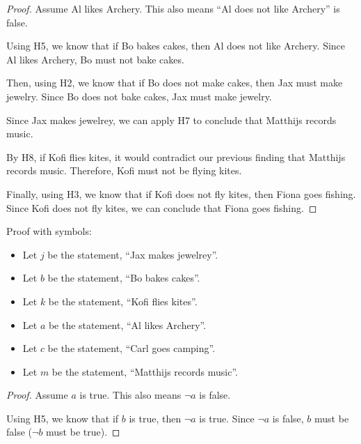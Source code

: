 \documentclass{article}
\begin{document}
\begin{enumerate}
          \begin{proof}
              Assume Al likes Archery. This also means ``Al does not like Archery'' is false.

              Using H5, we know that if Bo bakes cakes, then Al does not like Archery. Since
              Al likes Archery, Bo must not bake cakes.

              Then, using H2, we know that if Bo does not make cakes, then Jax must make
              jewelry. Since Bo does not bake cakes, Jax must make jewelry.

              Since Jax makes jewelrey, we can apply H7 to conclude that Matthijs records
              music.

              By H8, if Kofi flies kites, it would contradict our previous finding that
              Matthijs records music. Therefore, Kofi must not be flying kites.

              Finally, using H3, we know that if Kofi does not fly kites, then Fiona goes
              fishing. Since Kofi does not fly kites, we can conclude that Fiona goes
              fishing.

          \end{proof}

          Proof with symbols:

          \begin{itemize}
              \item Let $j$ be the statement, ``Jax makes jewelrey''.
              \item Let $b$ be the statement, ``Bo bakes cakes''.
              \item Let $k$ be the statement, ``Kofi flies kites''.
              \item Let $a$ be the statement, ``Al likes Archery''.
              \item Let $c$ be the statement, ``Carl goes camping''.
              \item Let $m$ be the statement, ``Matthijs records music''.

          \end{itemize}

          \begin{proof}
              Assume $a$ is true. This also means $\neg a$ is false.

              Using H5, we know that if $b$ is true, then $\neg a$ is true. Since $\neg a$ is
              false, $b$ must be false ($\neg b$ must be true).


\end{proof}
\end{enumerate}
\end{document}
